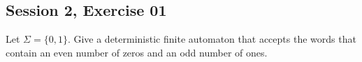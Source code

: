 \subsection{Session 2, Exercise 01}


Let $\Sigma=\{0,1\}$. Give a deterministic finite automaton that accepts the words that contain an even number of zeros and an odd number of ones.

